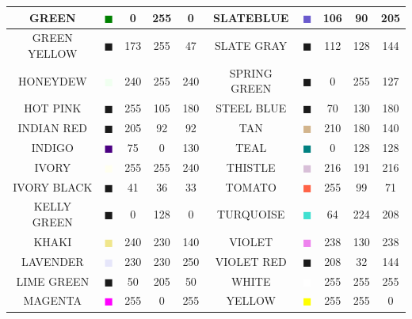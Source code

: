 \documentclass[11pt]{book}
\begin{document}
\begin{table}[p]
\begin{center}
\begin{tabular}{|c|c|c|c|c|c||c|c|c|c|}
{\ct GREEN} & \textcolor{GREEN} {$\blacksquare$} & 0& 255& 0& {\ct SLATEBLUE} &  \textcolor{SLATEBLUE} {$\blacksquare$} & 106& 90& 205  \\ \hline
{\ct GREEN YELLOW} & \textcolor{GREEN YELLOW} {$\blacksquare$} & 173& 255& 47& {\ct SLATE GRAY} &  \textcolor{SLATE GRAY} {$\blacksquare$} & 112& 128& 144  \\ \hline
{\ct HONEYDEW} & \textcolor{HONEYDEW} {$\blacksquare$} & 240& 255& 240& {\ct SPRING GREEN} &  \textcolor{SPRING GREEN} {$\blacksquare$} & 0& 255& 127  \\ \hline
{\ct HOT PINK} & \textcolor{HOT PINK} {$\blacksquare$} & 255& 105& 180& {\ct STEEL BLUE} &  \textcolor{STEEL BLUE} {$\blacksquare$} & 70& 130& 180  \\ \hline
{\ct INDIAN RED} & \textcolor{INDIAN RED} {$\blacksquare$} & 205& 92& 92& {\ct TAN} &  \textcolor{TAN} {$\blacksquare$} & 210& 180& 140  \\ \hline
{\ct INDIGO} & \textcolor{INDIGO} {$\blacksquare$} & 75& 0& 130& {\ct TEAL} &  \textcolor{TEAL} {$\blacksquare$} & 0& 128& 128  \\ \hline
{\ct IVORY} & \textcolor{IVORY} {$\blacksquare$} & 255& 255& 240& {\ct THISTLE} &  \textcolor{THISTLE} {$\blacksquare$} & 216& 191& 216  \\ \hline
{\ct IVORY BLACK} & \textcolor{IVORY BLACK} {$\blacksquare$} & 41& 36& 33& {\ct TOMATO } &  \textcolor{TOMATO } {$\blacksquare$} & 255& 99& 71  \\ \hline
{\ct KELLY GREEN} & \textcolor{KELLY GREEN} {$\blacksquare$} & 0& 128& 0& {\ct TURQUOISE} &  \textcolor{TURQUOISE} {$\blacksquare$} & 64& 224& 208  \\ \hline
{\ct KHAKI} & \textcolor{KHAKI} {$\blacksquare$} & 240& 230& 140& {\ct VIOLET} &  \textcolor{VIOLET} {$\blacksquare$} & 238& 130& 238  \\ \hline
{\ct LAVENDER} & \textcolor{LAVENDER} {$\blacksquare$} & 230& 230& 250& {\ct VIOLET RED} &  \textcolor{VIOLET RED} {$\blacksquare$} & 208& 32& 144  \\ \hline
{\ct LIME GREEN} & \textcolor{LIME GREEN} {$\blacksquare$} & 50& 205& 50& {\ct WHITE} &  \textcolor{WHITE} {$\blacksquare$} & 255& 255& 255  \\ \hline
{\ct MAGENTA} & \textcolor{MAGENTA} {$\blacksquare$} & 255& 0& 255& {\ct YELLOW} &  \textcolor{YELLOW} {$\blacksquare$} & 255& 255& 0  \\ \hline
\end{tabular}
\end{center}
\end{table}
\end{document}
